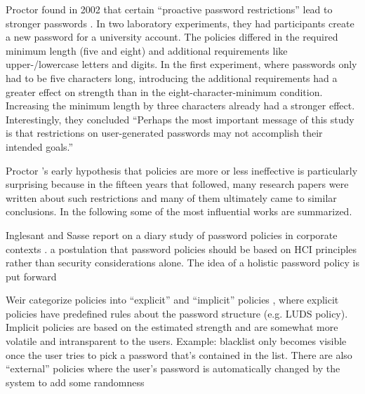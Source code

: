 	Proctor \etal found in 2002 that certain ``proactive password restrictions'' lead to stronger passwords \cite{Proctor2002ImprovingAuthenticationProactivePasswordRestrictions}. In two laboratory experiments, they had participants create a new password for a university account. The policies differed in the required minimum length (five and eight) and additional requirements like upper-/lowercase letters and digits. In the first experiment, where passwords only had to be five characters long, introducing the additional requirements had a greater effect on strength than in the eight-character-minimum condition. Increasing the minimum length by three characters already had a stronger effect. Interestingly, they concluded ``Perhaps the most important message of this study is that restrictions on user-generated passwords may not accomplish their intended goals.'' 
	
	
	Proctor \etal's early hypothesis that policies are more or less ineffective is particularly surprising because in the fifteen years that followed, many research papers were written about such restrictions and many of them ultimately came to similar conclusions. In the following some of the most influential works are summarized.
	
	Inglesant and Sasse report on a diary study of password policies in corporate contexts \cite{Inglesant2010TrueCostOfUnusablePolicies}. a postulation that password policies should be based on HCI principles rather than security considerations alone. The idea of a holistic password policy is put forward 
	
	 
	
	

	
	
	Weir \etal categorize policies into ``explicit'' and ``implicit'' policies \cite{Weir2010MetricsPolicies}, where explicit policies have predefined rules about the password structure (e.g. LUDS policy). Implicit policies are based on the estimated strength and are somewhat more volatile and intransparent to the users. Example: blacklist only becomes visible once the user tries to pick a password that's contained in the list. There are also ``external'' policies where the user's password is automatically changed by the system to add some randomness
	
